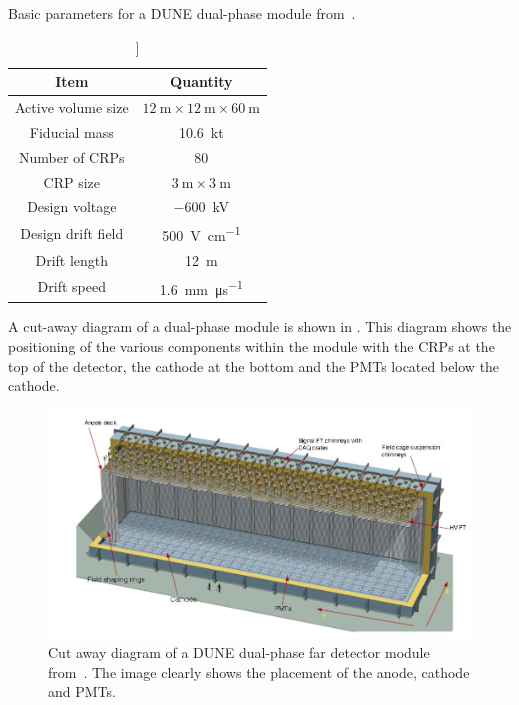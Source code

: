 \begin{table}
  \caption[Basic parameters for a DUNE dual-phase module.]]{Basic parameters for a DUNE dual-phase module from~\cite{idrVol3}.}
  \label{tab:dpStats}
  \centering
  \begin{tabular}{c c}
    \hline
    \hline
    Item & Quantity \\
    \hline
    Active volume size & $\SI{12}{\metre} \times \SI{12}{\metre} \times \SI{60}{\metre}$ \\
    Fiducial mass & \SI{10.6}{\kilo\tonne} \\
    Number of CRPs & 80 \\
    CRP size & $\SI{3}{\metre} \times \SI{3}{\metre}$ \\
    Design voltage & \SI{-600}{\kilo\volt} \\
    Design drift field & \SI{500}{\volt\per\centi\metre} \\
    Drift length & \SI{12}{\metre} \\
    Drift speed & \SI{1.6}{\milli\metre\per\micro\second} \\
    \hline
  \end{tabular}
\end{table}

A cut-away diagram of a dual-phase module is shown in .
This diagram shows the positioning of the various components within the module with the CRPs at the top of the detector, the cathode at the bottom and the PMTs located below the cathode. 

\begin{figure}[h]
  \centering
  \includegraphics[width=.75\linewidth]{files/figures/dune_detector/DUNE-dp}
  \caption[Diagram of a DUNE dual-phase far detector module.]{Cut away diagram of a DUNE dual-phase far detector module from~\cite{idrVol3}. The image clearly shows the placement of the anode, cathode and PMTs.}
  \label{fig:duneDualPhase}
\end{figure}

